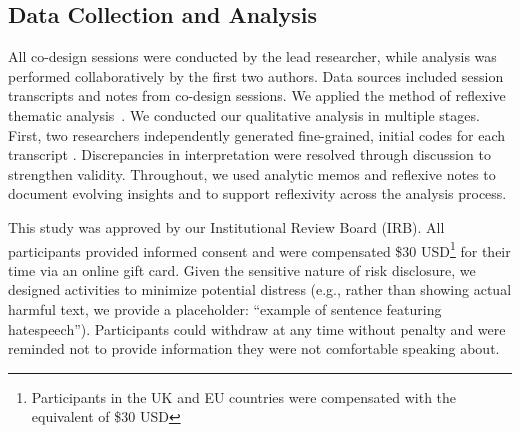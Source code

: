 
\subsection{Data Collection and Analysis}
All co-design sessions were conducted by the lead researcher, while analysis was performed collaboratively by the first two authors. Data sources included session transcripts and notes from co-design sessions. We applied the method of reflexive thematic analysis~\cite{clarke2017thematic, smith1995semi}. We conducted our qualitative analysis in multiple stages. First, two researchers independently generated fine-grained, initial codes for each transcript .  Discrepancies in interpretation were resolved through discussion to strengthen validity. Throughout, we used analytic memos and reflexive notes to document evolving insights and to support reflexivity across the analysis process.


This study was approved by our Institutional Review Board (IRB). All participants provided informed consent and were compensated \$30 USD\footnote{Participants in the UK and EU countries were compensated with the equivalent of \$30 USD} for their time via an online gift card. Given the sensitive nature of risk disclosure, we designed activities to minimize potential distress (e.g., rather than showing actual harmful text, we provide a placeholder: ``example of sentence featuring hatespeech''). Participants could withdraw at any time without penalty and were reminded not to provide information they were not comfortable speaking about. 

